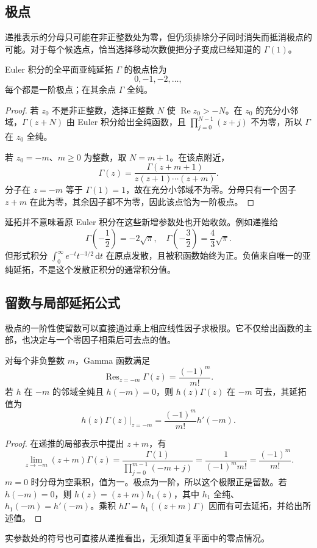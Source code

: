 \subsection{极点}
\label{b3:subsec:210202}

递推表示的分母只可能在非正整数处为零，但仍须排除分子同时消失而抵消极点的可能。对于每个候选点，恰当选择移动次数便把分子变成已经知道的 \(\Gamma(1)\)。

\begin{proposition}\label{b3:prop:21-poles}
Euler 积分的全平面亚纯延拓 \(\Gamma\) 的极点恰为
\[
 0,-1,-2,\ldots,
\]
每个都是一阶极点；在其余点 \(\Gamma\) 全纯。
\end{proposition}
\begin{proof}
若 \(z_0\) 不是非正整数，选择正整数 \(N\) 使 \(\operatorname{Re}z_0>-N\)。在 \(z_0\) 的充分小邻域，\(\Gamma(z+N)\) 由 Euler 积分给出全纯函数，且 \(\prod_{j=0}^{N-1}(z+j)\) 不为零，所以 \(\Gamma\) 在 \(z_0\) 全纯。

若 \(z_0=-m\)、\(m\ge0\) 为整数，取 \(N=m+1\)。在该点附近，
\[
 \Gamma(z)=\frac{\Gamma(z+m+1)}{z(z+1)\cdots(z+m)}.
\]
分子在 \(z=-m\) 等于 \(\Gamma(1)=1\)，故在充分小邻域不为零。分母只有一个因子 \(z+m\) 在此为零，其余因子都不为零，因此该点恰为一阶极点。
\end{proof}
延拓并不意味着原 Euler 积分在这些新增参数处也开始收敛。例如递推给
\[
 \Gamma\left(-\frac12\right)=-2\sqrt\pi,
 \quad
 \Gamma\left(-\frac32\right)=\frac43\sqrt\pi.
\]
但形式积分 \(\int_0^\infty e^{-t}t^{-3/2}\,\mathrm{d}t\) 在原点发散，且被积函数始终为正。负值来自唯一的亚纯延拓，不是这个发散正积分的通常积分值。

\subsection{留数与局部延拓公式}
\label{b3:subsec:210203}

极点的一阶性使留数可以直接通过乘上相应线性因子求极限。它不仅给出函数的主部，也决定与一个零因子相乘后可去点的值。

\begin{proposition}[极点留数]\label{b3:prop:21-residues}
对每个非负整数 \(m\)，Gamma 函数满足
\[
 \operatorname{Res}_{z=-m}\Gamma(z)=\frac{(-1)^m}{m!}.
\]
若 \(h\) 在 \(-m\) 的邻域全纯且 \(h(-m)=0\)，则 \(h(z)\Gamma(z)\) 在 \(-m\) 可去，其延拓值为
\[
 \left.h(z)\Gamma(z)\right|_{z=-m}
 =\frac{(-1)^m}{m!}h'(-m).
\]
\end{proposition}
\begin{proof}
在递推的局部表示中提出 \(z+m\)，有
\[
 \lim_{z\to-m}(z+m)\Gamma(z)
 =\frac{\Gamma(1)}{\prod_{j=0}^{m-1}(-m+j)}
 =\frac1{(-1)^m m!}
 =\frac{(-1)^m}{m!}.
\]
\(m=0\) 时分母为空乘积，值为一。极点为一阶，所以这个极限正是留数。若 \(h(-m)=0\)，则 \(h(z)=(z+m)h_1(z)\)，其中 \(h_1\) 全纯、\(h_1(-m)=h'(-m)\)。乘积 \(h\Gamma=h_1((z+m)\Gamma)\) 因而有可去延拓，并给出所述值。
\end{proof}
实参数处的符号也可直接从递推看出，无须知道复平面中的零点情况。

